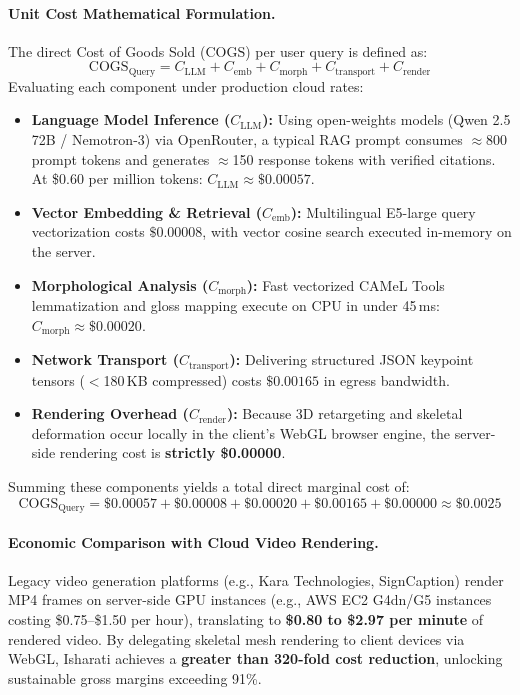 \paragraph{Unit Cost Mathematical Formulation.}
The direct Cost of Goods Sold ($\text{COGS}$) per user query is defined as:
\begin{equation}
\label{eq:cogs_formulation}
\text{COGS}_{\text{Query}} = C_{\text{LLM}} + C_{\text{emb}} + C_{\text{morph}} + C_{\text{transport}} + C_{\text{render}}
\end{equation}
Evaluating each component under production cloud rates:
\begin{itemize}[leftmargin=*,itemsep=2pt]
  \item \textbf{Language Model Inference ($C_{\text{LLM}}$):} Using open-weights models (Qwen 2.5 72B / Nemotron-3) via OpenRouter, a typical RAG prompt consumes $\approx$800 prompt tokens and generates $\approx$150 response tokens with verified citations. At \$0.60 per million tokens: $C_{\text{LLM}} \approx \$0.00057$.
  \item \textbf{Vector Embedding \& Retrieval ($C_{\text{emb}}$):} Multilingual E5-large query vectorization costs $\$0.00008$, with vector cosine search executed in-memory on the server.
  \item \textbf{Morphological Analysis ($C_{\text{morph}}$):} Fast vectorized CAMeL Tools lemmatization and gloss mapping execute on CPU in under 45\,ms: $C_{\text{morph}} \approx \$0.00020$.
  \item \textbf{Network Transport ($C_{\text{transport}}$):} Delivering structured JSON keypoint tensors ($<$180\,KB compressed) costs $\$0.00165$ in egress bandwidth.
  \item \textbf{Rendering Overhead ($C_{\text{render}}$):} Because 3D retargeting and skeletal deformation occur locally in the client's WebGL browser engine, the server-side rendering cost is \textbf{strictly \$0.00000}.
\end{itemize}
Summing these components yields a total direct marginal cost of:
\begin{equation}
\text{COGS}_{\text{Query}} = \$0.00057 + \$0.00008 + \$0.00020 + \$0.00165 + \$0.00000 \approx \mathbf{\$0.0025}
\end{equation}

\paragraph{Economic Comparison with Cloud Video Rendering.}
Legacy video generation platforms (e.g., Kara Technologies, SignCaption) render MP4 frames on server-side GPU instances (e.g., AWS EC2 G4dn/G5 instances costing \$0.75--\$1.50 per hour), translating to \textbf{\$0.80 to \$2.97 per minute} of rendered video. By delegating skeletal mesh rendering to client devices via WebGL, Isharati achieves a \textbf{greater than 320-fold cost reduction}, unlocking sustainable gross margins exceeding 91\%.

